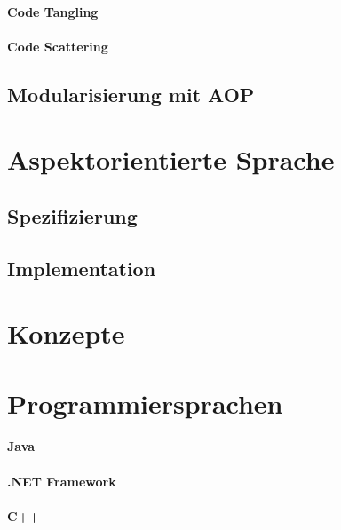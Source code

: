 \paragraph{Code Tangling}

\paragraph{Code Scattering}

\subsection{Modularisierung mit AOP}
\label{sec:aop_modaop}


\section{Aspektorientierte Sprache}
\label{sec:aop_lang}

\subsection{Spezifizierung}

\subsection{Implementation}

\section{Konzepte}

\section{Programmiersprachen}

\paragraph{Java}

\paragraph{.NET Framework}

\paragraph{C++}